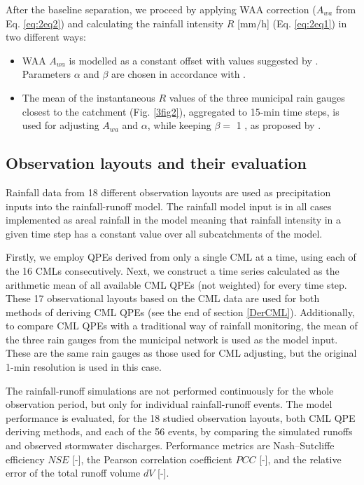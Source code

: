 \documentclass{ctuthesis}\usepackage[]{graphicx}\usepackage[]{color}
\begin{document}
After the baseline separation, we proceed by applying WAA correction ($A_{wa}$ from Eq. \ref{eq:2eq2}) and calculating the rainfall intensity $R$ [mm/h] (Eq. \ref{eq:2eq1}) in two different ways:
        \begin{itemize}
                \item WAA $A_{wa}$ is modelled as a constant offset with values suggested by \cite{overeemMeasuringUrbanRainfall2011}. Parameters $\alpha$ and $\beta$ are chosen in accordance with \cite{recommendation2005838}.
                \item The mean of the instantaneous $R$ values of the three municipal rain gauges closest to the catchment (Fig. \ref{3fig2}), aggregated to 15-min time steps, is used for adjusting $A_{wa}$ and $\alpha$, while keeping $\beta =$ 1 , as proposed by \cite{fenclGaugeadjustedRainfallEstimates2017}.
        \end{itemize}



\subsection{Observation layouts and their evaluation} \label{ObsLay}

Rainfall data from 18 different observation layouts are used as precipitation inputs into the rainfall-runoff model. The rainfall model input is in all cases implemented as areal rainfall in the model meaning that rainfall intensity in a given time step has a constant value over all subcatchments of the model. 

Firstly, we employ QPEs derived from only a single CML at a time, using each of the 16 CMLs consecutively. Next, we construct a time series calculated as the arithmetic mean of all available CML QPEs (not weighted) for every time step. These 17 observational layouts based on the CML data are used for both methods of deriving CML QPEs (see the end of section \ref{DerCML}). Additionally, to compare CML QPEs with a traditional way of rainfall monitoring, the mean of the three rain gauges from the municipal network is used as the model input. These are the same rain gauges as those used for CML adjusting, but the original 1-min resolution is used in this case. 

The rainfall-runoff simulations are not performed continuously for the whole observation period, but only for individual rainfall-runoff events. The model performance is evaluated, for the 18 studied observation layouts, both CML QPE deriving methods, and each of the 56 events, by comparing the simulated runoffs and observed stormwater discharges. Performance metrics are Nash–Sutcliffe efficiency $NSE$ [-], the Pearson correlation coefficient $PCC$ [-], and the relative error of the total runoff volume $dV$ [-].
\end{document}
